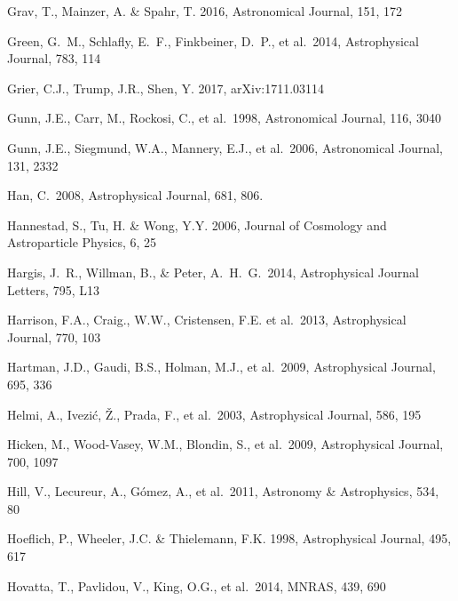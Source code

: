 \documentclass[twocolumn]{aastex61}
\begin{document}
\begin{thebibliography}{}
 Grav, T., Mainzer, A. \& Spahr, T. 2016, Astronomical Journal, 151, 172

 Green, G.~M., Schlafly, E.~F., Finkbeiner, D.~P., et al.~2014, Astrophysical Journal, 783, 114

 Grier, C.J., Trump, J.R., Shen, Y. 2017, arXiv:1711.03114

 Gunn, J.E., Carr, M., Rockosi, C., et al.~1998, Astronomical Journal, 116, 3040

 Gunn, J.E., Siegmund, W.A., Mannery, E.J., et al.~2006, Astronomical Journal, 131, 2332

 Han, C.~2008, Astrophysical Journal, 681, 806.

 Hannestad, S., Tu, H. \& Wong, Y.Y. 2006, Journal of Cosmology and Astroparticle Physics, 6, 25

 Hargis, J.~R., Willman, B., \& Peter, A.~H.~G.\ 2014, Astrophysical Journal Letters, 795, L13

 Harrison, F.A., Craig., W.W., Cristensen, F.E. et al.~2013, Astrophysical Journal, 770, 103

 Hartman, J.D., Gaudi, B.S., Holman, M.J., et al.~2009, Astrophysical Journal, 695, 336

 Helmi, A., Ivezi\'{c}, \v{Z}., Prada, F., et al.~2003, Astrophysical Journal, 586, 195

 Hicken, M., Wood-Vasey, W.M., Blondin, S., et al.~2009, Astrophysical Journal, 700, 1097

 Hill, V., Lecureur, A., G{\'o}mez, A., et al.~2011, Astronomy \& Astrophysics, 534, 80

 Hoeflich, P., Wheeler, J.C. \& Thielemann, F.K. 1998, Astrophysical Journal, 495, 617

 Hovatta, T., Pavlidou, V., King, O.G., et al.~2014, MNRAS, 439, 690


\end{thebibliography}
\end{document}
